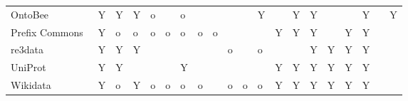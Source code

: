 \begin{table}
\begin{tabular}{llllllllllllllllllll}
                 OntoBee~\cite{Ong2017} &              Y &        Y &     Y &          o &            &        o &                &               &         &         &       Y &                            &         Y &                 Y &                    &               &               Y &                &             Y \\
    Prefix Commons~\cite{prefixcommons} &              Y &        o &     o &          o &          o &        o &              o &             o &         &         &         &                          Y &         Y &                 Y &                    &             Y &               Y &                &               \\
                                re3data &              Y &        Y &     Y &            &            &          &                &               &       o &         &       o &                            &           &                 Y &                  Y &             Y &               Y &                &               \\
             UniProt~\cite{Bateman2021} &              Y &        Y &       &            &            &        Y &                &               &         &         &         &                          Y &         Y &                 Y &                  Y &             Y &               Y &                &               \\
        Wikidata~\cite{Waagmeester2020} &              Y &        o &     Y &          o &          o &        o &              o &               &       o &       o &       o &                          Y &         Y &                 Y &                  Y &             Y &               Y &                &               \\
\bottomrule
\end{tabular}
\end{table}

